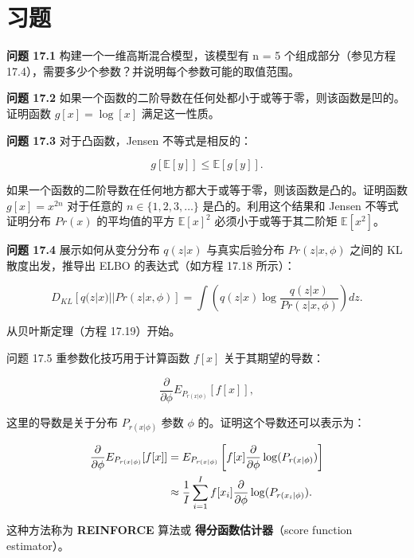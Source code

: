 \documentclass[lang=cn,newtx,10pt,scheme=chinese]{elegantbook}
\begin{document}
\section{习题}  
\textbf{问题 17.1} 构建一个一维高斯混合模型，该模型有 n = 5 个组成部分（参见方程 17.4），需要多少个参数？并说明每个参数可能的取值范围。

\textbf{问题 17.2} 如果一个函数的二阶导数在任何处都小于或等于零，则该函数是凹的。证明函数 \(g[x] = \log[x]\) 满足这一性质。

\textbf{问题 17.3} 对于凸函数，Jensen 不等式是相反的：

\begin{equation}
g[\mathbb{E}[y]] \leq \mathbb{E}[g[y]]. 
\end{equation}

如果一个函数的二阶导数在任何地方都大于或等于零，则该函数是凸的。证明函数 \(g[x] = x^{2n}\) 对于任意的 \(n \in \{1, 2, 3, \ldots\}\) 是凸的。利用这个结果和 Jensen 不等式证明分布 \(Pr(x)\) 的平均值的平方 \(\mathbb{E}[x]^2\) 必须小于或等于其二阶矩 \(\mathbb{E}[x^2]\)。

\textbf{问题 17.4} 展示如何从变分分布 \(q(z|x)\) 与真实后验分布 \(Pr(z|x, \phi)\) 之间的 KL 散度出发，推导出 ELBO 的表达式（如方程 17.18 所示）：

\begin{equation}
D_{KL} [q(z|x) || Pr(z|x, \phi)] = \int (q(z|x) \log \frac{q(z|x)}{Pr(z|x, \phi)}) dz. 
\end{equation}

从贝叶斯定理（方程 17.19）开始。

问题 17.5 重参数化技巧用于计算函数 \(f[x]\) 关于其期望的导数：

\begin{equation}
\frac{\partial}{\partial\phi} E_{P_{r(x|\phi)}} [f[x]], 
\end{equation}

这里的导数是关于分布 \(P_{r(x|\phi)}\) 参数 \(\phi\) 的。证明这个导数还可以表示为：


\begin{align}
\frac{\partial}{\partial\phi} E_{P_{r(x|\phi)}} [f[x]] &= E_{P_{r(x|\phi)}} \left[ f[x] \frac{\partial}{\partial\phi} \log(P_{r(x|\phi)}) \right] \notag \\
&\approx \frac{1}{I} \sum_{i=1}^{I} f[x_i] \frac{\partial}{\partial\phi} \log(P_{r(x_i|\phi)}). 
\end{align} 


这种方法称为 \textbf{REINFORCE} 算法或 \textbf{得分函数估计器}（score function estimator）。
\end{document}
